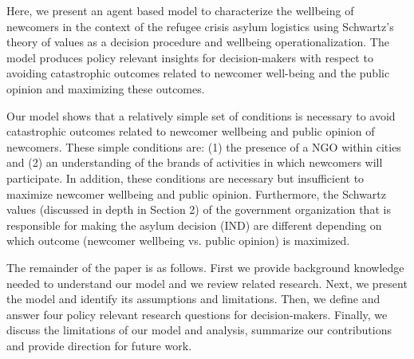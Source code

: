 \documentclass{scspaperproc}
\theoremstyle{scsthe}
\begin{document}

Here, we present an agent based model to characterize the wellbeing of newcomers in the context of the refugee crisis asylum logistics using Schwartz's theory of values as a decision procedure and wellbeing operationalization. The model produces policy relevant insights for decision-makers with respect to avoiding catastrophic outcomes related to newcomer well-being and the public opinion and maximizing these outcomes.

Our model shows that a relatively simple set of conditions is necessary to avoid catastrophic outcomes related to newcomer wellbeing and public opinion of newcomers. These simple conditions are: (1) the presence of a NGO within cities and (2) an understanding of the brands of activities in which newcomers will participate. In addition, these conditions are necessary but insufficient to maximize newcomer wellbeing and public opinion. Furthermore, the Schwartz values (discussed in depth in Section 2) of the government organization that is responsible for making the asylum decision (IND) are different depending on which outcome (newcomer wellbeing vs. public opinion) is maximized. 

The remainder of the paper is as follows. First we provide background knowledge needed to understand our model and we review related research. Next, we present the model and identify its assumptions and limitations. Then, we define and answer four policy relevant research questions for decision-makers. Finally, we discuss the limitations of our model and analysis, summarize our contributions and provide direction for future work.
\end{document}
